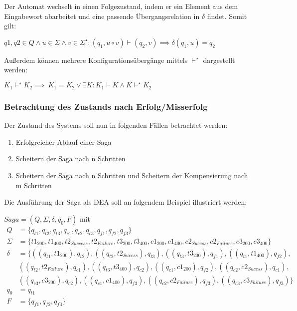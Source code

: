 Der Automat wechselt in einen Folgezustand, indem er ein Element aus dem Eingabewort abarbeitet und eine passende Übergangsrelation in $\delta$ findet. Somit gilt:

\begin{center}
$q1, q2 \in Q \land u \in \Sigma \land v \in \Sigma^{\star}: (q_{1}, u \circ v)\vdash (q_{2}, v) \implies \delta(q_{1}, u) = q_{2}$
\end{center}

Außerdem können mehrere Konfigurationsübergänge mittels $\vdash^{\star}$ dargestellt werden:

\begin{center}
$K_1 \vdash^{\star} K_2 \implies \ K_1 = K_2 \lor \exists K: K_1 \vdash K \land K \vdash^{\star} K_2$
\end{center}

\subsubsection{Betrachtung des Zustands nach Erfolg/Misserfolg}\label{subsubsection_dea_simple}
Der Zustand des Systems soll nun in folgenden Fällen betrachtet werden:
\begin{enumerate}%
	\item Erfolgreicher Ablauf einer Saga
	\item Scheitern der Saga nach n Schritten
	\item Scheitern der Saga nach n Schritten und Scheitern der Kompensierung nach m Schritten
\end{enumerate}

Die Ausführung der Saga als DEA soll an folgendem Beispiel illustriert werden:

$Saga = (Q, \Sigma, \delta, q_0, F)$ mit
\begin{align*}
Q &= \{q_{t1}, q_{t2}, q_{t3}, q_{c1}, q_{c2}, q_{c3}, q_{f1}, q_{f2}, q_{f3}\}\\
\Sigma &= \{t1_{200}, t1_{400}, t2_{Success}, t2_{Failure}, t3_{200}, t3_{400}, c1_{200}, c1_{400}, c2_{Sucess}, c2_{Failure}, c3_{200}, c3_{400}\}\\
\delta &= \{((q_{t1}, t1_{200}), q_{t2}), 
((q_{t2}, t2_{Sucess}), q_{t3}), 
((q_{t3}, t3_{200}), q_{f1}), 
((q_{t1}, t1_{400}), q_{f2}), \\
&((q_{t2}, t2_{Failure}), q_{c1}), 
((q_{t3}, t3_{400}), q_{c2}), 
((q_{c1}, c1_{200}), q_{f2}), 
((q_{c2}, c2_{Sucess}), q_{c1}),\\ 
&((q_{c3}, c3_{200}), q_{c2}), 
((q_{c1}, c1_{400}), q_{f3}), 
((q_{c2}, c2_{Failure}), q_{f3}), 
((q_{c3}, c3_{Failure}), q_{f3})\} \\
q_0 &= q_{t1}\\
F &= \{q_{f1}, q_{f2}, q_{f3}\}
\end{align*}


